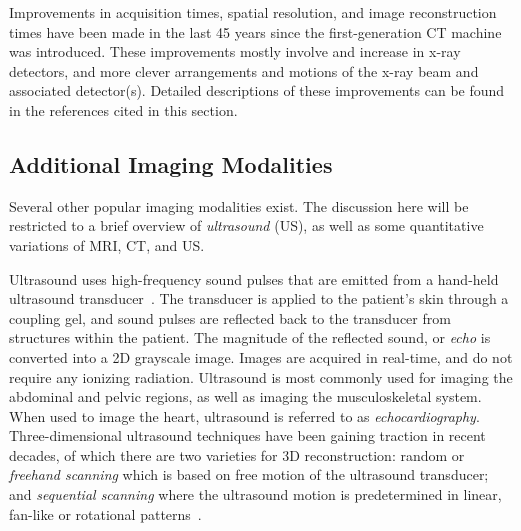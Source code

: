 Improvements in acquisition times, spatial resolution, and image reconstruction times have been made in the last 45 years since the first-generation CT machine was introduced. These improvements mostly involve and increase in x-ray detectors, and more clever arrangements and motions of the x-ray beam and associated detector(s). Detailed descriptions of these improvements can be found in the references cited in this section.

\subsection{Additional Imaging Modalities}
\label{Other Imaging Modalities}

Several other popular imaging modalities exist. The discussion here will be restricted to a brief overview of \textit{ultrasound} (US), as well as some quantitative variations of MRI, CT, and US.

Ultrasound uses high-frequency sound pulses that are emitted from a hand-held ultrasound transducer~\cite{waldman_campbell}. The transducer is applied to the patient's skin through a coupling gel, and sound pulses are reflected back to the transducer from structures within the patient. The magnitude of the reflected sound, or \textit{echo} is converted into a 2D grayscale image. Images are acquired in real-time, and do not require any ionizing radiation. Ultrasound is most commonly used for imaging the abdominal and pelvic regions, as well as imaging the musculoskeletal system. When used to image the heart, ultrasound is referred to as \textit{echocardiography}. Three-dimensional ultrasound techniques have been gaining traction in recent decades, of which there are two varieties for 3D reconstruction: random or \textit{freehand scanning} which is based on free motion of the ultrasound transducer; and \textit{sequential scanning} where the ultrasound motion is predetermined in linear, fan-like or rotational patterns~\cite{valocik_2005, bruining_2000}.

